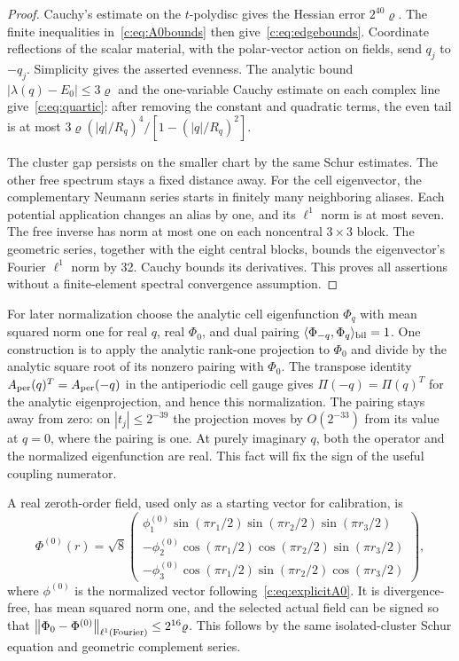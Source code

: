 \begin{proof}
Cauchy's estimate on the $t$-polydisc gives the Hessian error
$2^{40}\varrho$. The finite inequalities in~\eqref{c:eq:A0bounds}
then give~\eqref{c:eq:edgebounds}. Coordinate reflections of the scalar
material, with the polar-vector action on fields, send $q_j$ to $-q_j$.
Simplicity gives the asserted evenness. The analytic bound
$|\lambda(q)-E_0|\le3\varrho$ and the one-variable Cauchy estimate
on each complex line give~\eqref{c:eq:quartic}: after removing the
constant and quadratic terms, the even tail is at most
$3\varrho(|q|/R_q)^4/[1-(|q|/R_q)^2]$.

The cluster gap persists on the smaller chart by the same Schur
estimates. The other free spectrum stays a fixed distance away.
For the cell eigenvector, the complementary Neumann series starts in
finitely many neighboring aliases. Each potential application changes
an alias by one, and its $\ell^1$ norm is at most seven. The free
inverse has norm at most one on each noncentral $3\times3$ block.
The geometric series, together with the eight central blocks, bounds
the eigenvector's Fourier $\ell^1$ norm by 32. Cauchy bounds its
derivatives. This proves all assertions without a finite-element
spectral convergence assumption.
\end{proof}

For later normalization choose the analytic cell eigenfunction
$\Phi_q$ with mean squared norm one for real $q$, real $\Phi_0$,
and dual pairing $\langle\Phi_{-q},\Phi_q\rangle_{\rm bil}=1$.
One construction is to apply the analytic rank-one projection to
$\Phi_0$ and divide by the analytic square root of its nonzero pairing
with $\Phi_0$. The transpose identity $A_{\rm per}(q)^T=A_{\rm per}(-q)$ in the
antiperiodic cell gauge gives $\Pi(-q)=\Pi(q)^T$ for the analytic
eigenprojection, and hence this normalization. The pairing stays away
from zero: on $|t_j|\le2^{-39}$ the projection moves by $O(2^{-33})$
from its value at $q=0$, where the pairing is one. At purely imaginary
$q$, both the operator and the normalized eigenfunction are real.
This fact will fix the sign of the useful coupling numerator.

A real zeroth-order field, used only as a starting vector for calibration,
is
\begin{equation}
 \Phi^{(0)}(r)=\sqrt8\begin{pmatrix}
 \phi^{(0)}_1\sin(\pi r_1/2)\sin(\pi r_2/2)\sin(\pi r_3/2)\\
 -\phi^{(0)}_2\cos(\pi r_1/2)\cos(\pi r_2/2)\sin(\pi r_3/2)\\
 -\phi^{(0)}_3\cos(\pi r_1/2)\sin(\pi r_2/2)\cos(\pi r_3/2)
 \end{pmatrix},                                      \label{c:eq:initialphi}
\end{equation}
where $\phi^{(0)}$ is the normalized vector following~\eqref{c:eq:explicitA0}.
It is divergence-free, has mean squared norm one, and the selected
actual field can be signed so that
$\left\lVert \Phi_0-\Phi^{(0)}\right\rVert_{\ell^1({\rm Fourier})}\le2^{16}\varrho$.
This follows by the same isolated-cluster Schur equation and geometric
complement series.

